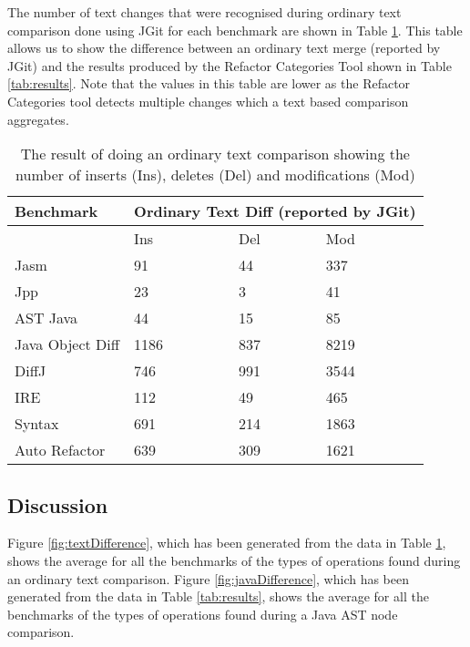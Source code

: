 The number of text changes that were recognised during ordinary text comparison done using JGit for each benchmark are shown in Table \ref{tab:textcomp}. This table allows us to show the difference between an ordinary text merge (reported by JGit) and the results produced by the Refactor Categories Tool shown in Table \ref{tab:results}. Note that the values in this table are lower as the Refactor Categories tool detects multiple changes which a text based comparison aggregates.  

\begin{table}[!p]
    \centering
    \begin{tabular}{l|lll}
    Benchmark        & \multicolumn{3}{|c}{Ordinary Text Diff (reported by JGit)} \\ \hline
    ~                & Ins            & Del & Mod  \\ \hline
    Jasm             & 91             & 44  & 337  \\
    Jpp              & 23             & 3   & 41   \\
    AST Java         & 44             & 15  & 85   \\
    Java Object Diff & 1186           & 837 & 8219 \\
    DiffJ            & 746            & 991 & 3544 \\
    IRE              & 112            & 49  & 465  \\
    Syntax           & 691            & 214 & 1863 \\
    Auto Refactor    & 639            & 309 & 1621 \\
    \end{tabular}
    \caption{The result of doing an ordinary text comparison showing the number of inserts (Ins), deletes (Del) and modifications (Mod)}
    \label{tab:textcomp}
\end{table}



  
\subsection{Discussion}
Figure \ref{fig:textDifference}, which has been generated from the data in Table \ref{tab:textcomp}, shows the average for all the benchmarks of the types of operations found during an ordinary text comparison.  
Figure \ref{fig:javaDifference}, which has been generated from the data in Table \ref{tab:results}, shows the average for all the benchmarks of the types of operations found during a Java AST node comparison.

